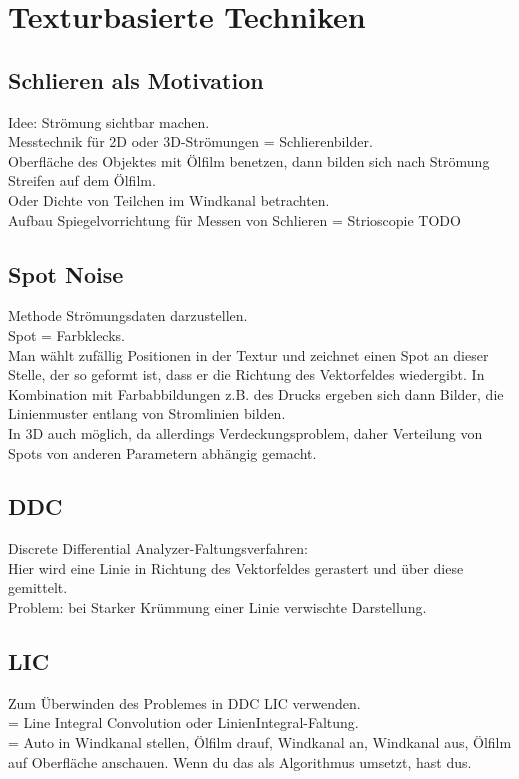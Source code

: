 \documentclass{article}
\begin{document}
\pagebreak
\section{Texturbasierte Techniken}
\subsection{Schlieren als Motivation}
Idee: Strömung sichtbar machen.\\
Messtechnik für 2D oder 3D-Strömungen = Schlierenbilder.\\

\noindent Oberfläche des Objektes mit Ölfilm benetzen, dann bilden sich nach Strömung Streifen auf dem Ölfilm.\\
Oder Dichte von Teilchen im Windkanal betrachten.\\

\noindent Aufbau Spiegelvorrichtung für Messen von Schlieren = Strioscopie TODO

\subsection{Spot Noise}
Methode Strömungsdaten darzustellen.\\
Spot = Farbklecks.\\
Man wählt zufällig Positionen in der Textur und zeichnet einen Spot an dieser Stelle, der so geformt ist, dass er die Richtung des Vektorfeldes wiedergibt. In Kombination mit Farbabbildungen z.B. des Drucks ergeben sich dann Bilder, die Linienmuster entlang von Stromlinien bilden.\\

\noindent In 3D auch möglich, da allerdings Verdeckungsproblem, daher Verteilung von Spots von anderen Parametern abhängig gemacht.\\

\subsection{DDC}

\noindent Discrete Differential Analyzer-Faltungsverfahren:\\
Hier wird eine Linie in Richtung des Vektorfeldes gerastert und über diese gemittelt.\\
Problem: bei Starker Krümmung einer Linie verwischte Darstellung. \\


\subsection{LIC}
Zum Überwinden des Problemes in DDC LIC verwenden.\\
= Line Integral Convolution oder LinienIntegral-Faltung.\\
= Auto in Windkanal stellen, Ölfilm drauf, Windkanal an, Windkanal aus, Ölfilm auf Oberfläche anschauen. Wenn du das als Algorithmus umsetzt, hast dus. 
\end{document}
